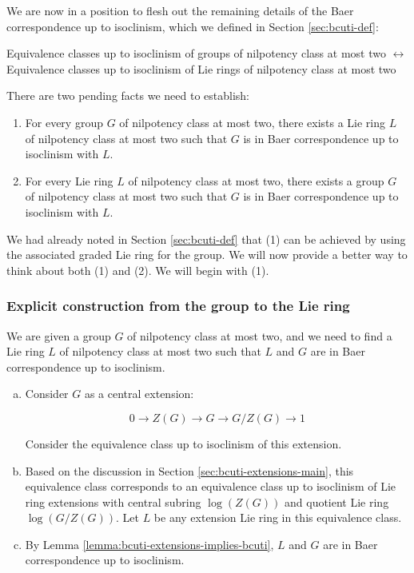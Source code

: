 \documentclass{ucetd}
\begin{document}
We are now in a position to flesh out the remaining details of the
Baer correspondence up to isoclinism, which we defined in Section
\ref{sec:bcuti-def}:

\begin{center}
  Equivalence classes up to isoclinism of groups of nilpotency class at
  most two $\leftrightarrow$ Equivalence classes up to isoclinism of Lie
  rings of nilpotency class at most two
\end{center}
There are two pending facts we need to establish:

\begin{enumerate}
\item For every group $G$ of nilpotency class at most two, there
  exists a Lie ring $L$ of nilpotency class at most two such that $G$
  is in Baer correspondence up to isoclinism with $L$.
\item For every Lie ring $L$ of nilpotency class at most two, there
  exists a group $G$ of nilpotency class at most two such that $G$ is
  in Baer correspondence up to isoclinism with $L$.
\end{enumerate}

We had already noted in Section \ref{sec:bcuti-def} that (1) can be
achieved by using the associated graded Lie ring for the group. We
will now provide a better way to think about both (1) and (2). We will
begin with (1).

\subsubsection{Explicit construction from the group to the Lie ring}

We are given a group $G$ of nilpotency class at most two, and we need
to find a Lie ring $L$ of nilpotency class at most two such that $L$
and $G$ are in Baer correspondence up to isoclinism.

\begin{enumerate}[(a)]
\item Consider $G$ as a central extension:

  $$0 \to Z(G) \to G \to G/Z(G) \to 1$$

  Consider the equivalence class up to isoclinism of this extension.

\item Based on the discussion in Section
  \ref{sec:bcuti-extensions-main}, this equivalence class corresponds
  to an equivalence class up to isoclinism of Lie ring extensions with
  central subring $\log(Z(G))$ and quotient Lie ring $\log(G/Z(G))$. Let
  $L$ be any extension Lie ring in this equivalence class.

\item By Lemma \ref{lemma:bcuti-extensions-implies-bcuti}, $L$ and $G$
  are in Baer correspondence up to isoclinism.
\end{enumerate}
\end{document}
